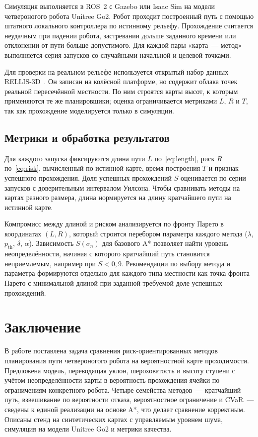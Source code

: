 \documentclass{misisarticle}
\begin{document}
Симуляция выполняется в ROS~2 с Gazebo или Isaac Sim на модели четвероногого робота Unitree Go2. Робот проходит построенный путь с помощью штатного локального контроллера по истинному рельефу. Прохождение считается неудачным при падении робота, застревании дольше заданного времени или отклонении от пути больше допустимого. Для каждой пары «карта~--- метод» выполняется серия запусков со случайными начальной и целевой точками.

Для проверки на реальном рельефе используется открытый набор данных RELLIS-3D~\cite{jiang2021}. Он записан на колёсной платформе, но содержит облака точек реальной пересечённой местности. По ним строятся карты высот, к которым применяются те же планировщики; оценка ограничивается метриками $L$, $R$ и $T$, так как прохождение моделируется только в симуляции.

\subsection{Метрики и обработка результатов}

Для каждого запуска фиксируются длина пути $L$ по~\eqref{eq:length}, риск $R$ по~\eqref{eq:risk}, вычисленный по истинной карте, время построения $T$ и признак успешного прохождения. Доля успешных прохождений $S$ оценивается по серии запусков с доверительным интервалом Уилсона. Чтобы сравнивать методы на картах разного размера, длина нормируется на длину кратчайшего пути на истинной карте.

Компромисс между длиной и риском анализируется по фронту Парето в координатах $(L, R)$, который строится перебором параметра каждого метода ($\lambda$, $p_{\mathrm{th}}$, $\delta$, $\alpha$). Зависимость $S(\sigma_n)$ для базового A* позволяет найти уровень неопределённости, начиная с которого кратчайший путь становится неприемлемым, например при $S < 0{,}9$. Рекомендации по выбору метода и параметра формируются отдельно для каждого типа местности как точка фронта Парето с минимальной длиной при заданной требуемой доле успешных прохождений.

\section{Заключение}

В работе поставлена задача сравнения риск-ориентированных методов планирования пути четвероногого робота на вероятностной карте проходимости. Предложена модель, переводящая уклон, шероховатость и высоту ступени с учётом неопределённости карты в вероятность прохождения ячейки по ограничениям конкретного робота. Четыре семейства методов~--- кратчайший путь, взвешивание по вероятности отказа, вероятностное ограничение и CVaR~--- сведены к единой реализации на основе A*, что делает сравнение корректным. Описаны стенд на синтетических картах с управляемым уровнем шума, симуляция на модели Unitree Go2 и метрики качества.
\end{document}
